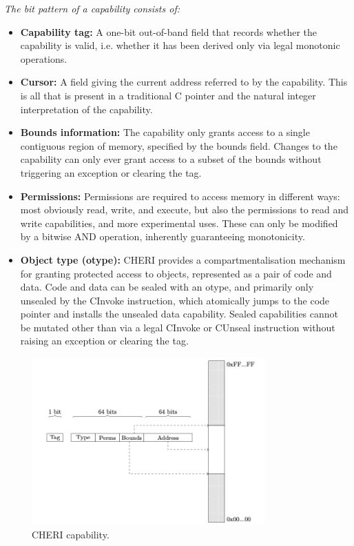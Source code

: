 \textit{The bit pattern\cite{watson_cheri_nodate} of a capability consists of:}
\begin{itemize}

\item \textbf{Capability tag:} A one-bit out-of-band field that records whether the capability is valid, i.e. whether it has been derived only 
via legal monotonic operations.

\item \textbf{Cursor:} A field giving the current address referred to by the capability. This is all 
that is present in a traditional C pointer and the natural integer interpretation of the capability.

\item \textbf{Bounds information:} The capability only grants access to a single contiguous region of memory, specified by the bounds field. Changes to the capability can only ever grant access 
to a subset of the bounds without triggering an exception or clearing the tag.

\item \textbf{Permissions:} Permissions are required to access memory in different ways: most obviously read, write, and execute, but also the permissions to read and write capabilities, and more
experimental uses. These can only be modified by a bitwise AND operation, inherently guaranteeing monotonicity.

\item \textbf{Object type (otype):} CHERI provides a compartmentalisation mechanism for granting protected access to objects, represented as a 
pair of code and data. Code and data can be sealed with an otype, and primarily only unsealed by the CInvoke instruction, which atomically jumps to the code pointer and installs 
the unsealed data capability. Sealed capabilities cannot be mutated other than via a legal CInvoke or CUnseal instruction without 
raising an exception or clearing the tag.

\end{itemize}

\begin{figure}[h]
  \includegraphics[width=0.8\textwidth]{chericapability.png}
  \caption{CHERI capability\cite{esswood_cherios_nodate-1}.}
  \label{fig:FlexPointer}
\end{figure}

